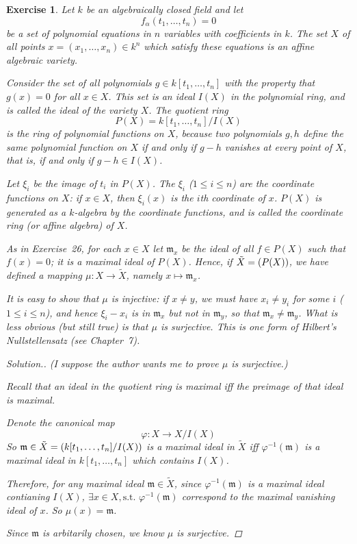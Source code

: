 \documentclass{article}
\theoremstyle{breakstyle}
\newtheorem{exercise}{Exercise}
\newenvironment{solution}
  {\begin{proof}[Solution.]\renewcommand{\qedsymbol}{}}
  {\end{proof}}
\let\max\relax
\DeclareMathOperator{\max}{Max}
\begin{document}
\begin{exercise}
Let \(k\) be an algebraically closed field and let
\[
f_\alpha(t_1,\ldots,t_n)=0
\]
be a set of polynomial equations in \(n\) variables with coefficients in \(k\). The set \(X\) of all points \(x=(x_1,\ldots,x_n)\in k^n\) which satisfy these equations is an affine algebraic variety.

Consider the set of all polynomials \(g\in k[t_1,\ldots,t_n]\) with the property that \(g(x)=0\) for all \(x\in X\). This set is an ideal \(I(X)\) in the polynomial ring, and is called the ideal of the variety \(X\). The quotient ring
\[
P(X)=k[t_1,\ldots,t_n]/I(X)
\]
is the ring of polynomial functions on \(X\), because two polynomials \(g,h\) define the same polynomial function on \(X\) if and only if \(g-h\) vanishes at every point of \(X\), that is, if and only if \(g-h\in I(X)\).

Let \(\xi_i\) be the image of \(t_i\) in \(P(X)\). The \(\xi_i\) (\(1\le i\le n\)) are the coordinate functions on \(X\): if \(x\in X\), then \(\xi_i(x)\) is the \(i\)th coordinate of \(x\). \(P(X)\) is generated as a \(k\)-algebra by the coordinate functions, and is called the coordinate ring (or affine algebra) of \(X\).

As in Exercise~26, for each \(x\in X\) let \(\mathfrak m_x\) be the ideal of all \(f\in P(X)\) such that \(f(x)=0\); it is a maximal ideal of \(P(X)\). Hence, if \(\tilde X=\max(P(X))\), we have defined a mapping \(\mu:X\to\tilde X\), namely \(x\mapsto\mathfrak m_x\).

It is easy to show that \(\mu\) is injective: if \(x\neq y\), we must have \(x_i\neq y_i\) for some \(i\) (\(1\le i\le n\)), and hence \(\xi_i-x_i\) is in \(\mathfrak m_x\) but not in \(\mathfrak m_y\), so that \(\mathfrak m_x\neq\mathfrak m_y\). What is less obvious (but still true) is that \(\mu\) is surjective. This is one form of Hilbert's Nullstellensatz (see Chapter~7).

\begin{solution}
    \emph{(I suppose the author wants me to prove }$\mu$\emph{ is surjective.) }

        Recall that an ideal in the quotient ring is maximal iff the preimage of that ideal is maximal.

        Denote the canonical map
        $$
        \varphi:X\longrightarrow X / I(X)
        $$
        So $\mathfrak{m}\in\tilde{X}=\max\left( k[t_1,\ldots ,t_{n}]/I(X) \right)$ is a maximal ideal in $\tilde{X}$ 
        iff $\varphi^{-1}(\mathfrak{m})$ is a maximal ideal in $k[t_1,\ldots ,t_{n}]$ which contains $I(X)$.

        Therefore, for any maximal ideal $\mathfrak{m}\in \tilde{X}$,
        since $\varphi^{-1}(\mathfrak{m})$ is a maximal ideal contianing $I(X)$,
        $\exists x\in X,\text{s.t. }\varphi^{-1}(\mathfrak{m})$ correspond to the maximal vanishing ideal of $x$.
        So $\mu(x)=\mathfrak{m}$.

        Since $\mathfrak{m}$ is arbitarily chosen, we know $\mu$ is surjective.
\end{solution}
\end{exercise}
\end{document}
